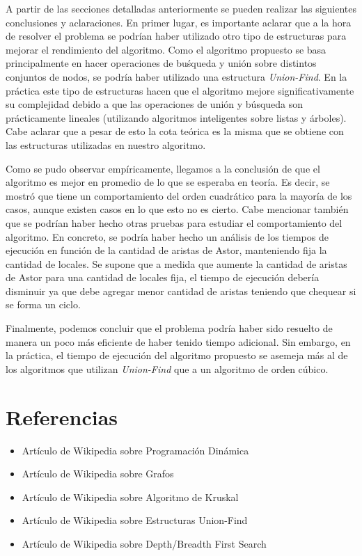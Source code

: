 \documentclass[a4paper,11pt] {article}
\begin{document}
A partir de las secciones detalladas anteriormente se pueden realizar las siguientes conclusiones y aclaraciones. En primer lugar, es importante aclarar que a la hora de resolver el problema se podr\'ian haber utilizado otro tipo de estructuras para mejorar el rendimiento del algoritmo. Como el algoritmo propuesto se basa principalmente en hacer operaciones de bu\'squeda y uni\'on sobre distintos conjuntos de nodos, se podr\'ia haber utilizado una estructura \textit{Union-Find}\footnotemark[1]. En la pr\'actica este tipo de estructuras hacen que el algoritmo mejore significativamente su complejidad debido a que las operaciones de uni\'on y b\'usqueda son pr\'acticamente lineales (utilizando algoritmos inteligentes sobre listas y \'arboles). Cabe aclarar que a pesar de esto la cota te\'orica es la misma que se obtiene con las estructuras utilizadas en nuestro algoritmo.

Como se pudo observar emp\'iricamente, llegamos a la conclusi\'on de que el algoritmo es mejor en promedio de lo que se esperaba en teor\'ia. Es decir, se mostr\'o que tiene un comportamiento del orden cuadr\'atico para la mayor\'ia de los casos, aunque existen casos en lo que esto no es cierto. Cabe mencionar tambi\'en que se podr\'ian haber hecho otras pruebas para estudiar el comportamiento del algoritmo. En concreto, se podr\'ia haber hecho un an\'alisis de los tiempos de ejecuci\'on en funci\'on de la cantidad de aristas de Astor, manteniendo fija la cantidad de locales. Se supone que a medida que aumente la cantidad de aristas de Astor para una cantidad de locales fija, el tiempo de ejecuci\'on deber\'ia disminuir ya que debe agregar menor cantidad de aristas teniendo que chequear si se forma un ciclo.

Finalmente, podemos concluir que el problema podr\'ia haber sido resuelto de manera un poco m\'as eficiente de haber tenido tiempo adicional. Sin embargo, en la pr\'actica, el tiempo de ejecuci\'on del algoritmo propuesto se asemeja m\'as al de los algoritmos que utilizan \textit{Union-Find} que a un algoritmo de orden c\'ubico.


\section*{Referencias}
\begin{itemize}
 \item Art\'iculo de Wikipedia sobre Programaci\'on Din\'amica
 \item Art\'iculo de Wikipedia sobre Grafos
 \item Art\'iculo de Wikipedia sobre Algoritmo de Kruskal
 \item Art\'iculo de Wikipedia sobre Estructuras Union-Find
 \item Art\'iculo de Wikipedia sobre Depth/Breadth First Search
\end{itemize}
\end{document}
